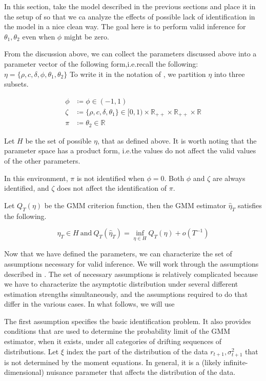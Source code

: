 \documentclass[11pt]{article}
\newcommand*{\R}{\mathbb{R}}
\newcommand*{\Eta}{H}
\begin{document}
In this section, take the model described in the previous sections and place it in the setup of
\textcite{andrewsGmm2014} so that we ca analyze the effects of possible lack of identification in the model in a
nice clean way.
The goal here is to perform valid inference for $\theta_1, \theta_2$ even when $\phi$ might be zero. 


From the discussion above, we can collect the parameters discussed above into a parameter vector of the following
form,i.e.\@ recall the following: $\eta = \lbrace \rho, c, \delta, \phi, \theta_1, \theta_2 \rbrace$
To write it in the notation of \textcite{andrewsGmm2014}, we partition $\eta$ into three subsets.

\begin{align}
    \phi &\coloneqq \phi  \in (-1, 1) \\ 
    \zeta &\coloneqq \lbrace \rho, c, \delta, \theta_1 \rbrace \in [0,1) \times \R_{++} \times \R_{++} \times
    \R  \\
    \pi &\coloneqq \theta_2 \in \R 
\end{align}

Let $\Eta$ be the set of possible $\eta$, that as defined above.
It is worth noting that the parameter space has a product form, i.e.\@ the values do not affect the valid values
of the other parameters.

In this environment, $\pi$ is not identified when $\phi = 0$.
Both $\phi$ and $\zeta$ are always identified, and $\zeta$ does not affect the identification of $\pi$.

Let $Q_T(\eta)$ be the GMM criterion function, then the GMM estimator $\hat{\eta}_T$ satisfies the following.


\begin{equation}
    \hat{\eta}_T \in \Eta\ \text{and}\ Q_T(\hat{\eta}_T) = \inf_{\eta \in \Eta} Q_T(\eta) +
    o\left(T^{-1}\right) 
\end{equation}


Now that we have defined the parameters, we can characterize the set of assumptions necessary for valid inference.
We will work through the assumptions described in \textcite{andrewsGmm2014}.
The set of necessary assumptions is relatively complicated because we have to characterize the asymptotic
distribution under several different estimation strengths simultaneously, and the assumptions required to do that
  differ in the various cases. 
In what follows, we will use 

The first assumption specifies the basic identification
problem. It also provides conditions that are used to determine the
probability limit of the GMM estimator, when it exists, under all categories
of drifting sequences of distributions.
Let $\xi$ index the part of the distribution of the data $r_{t+1}, \sigma^2_{t+1}$ that is not determined by the
moment equations.
In general, it is a (likely infinite-dimensional) nuisance parameter that affects the distribution of the data. 
\end{document}
